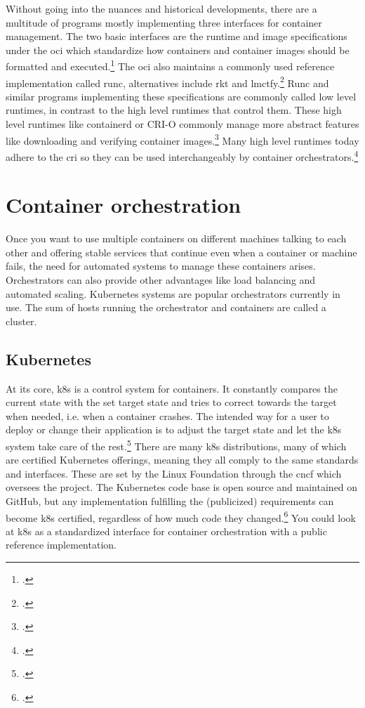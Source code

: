 Without going into the nuances and historical developments, there are a multitude of programs mostly implementing three interfaces for container management.
The two basic interfaces are the runtime and image specifications under the \gls{oci} which standardize how containers and container images should be formatted and executed.\footcite[][, first paragraph]{ociStandards}
The \gls{oci} also maintains a commonly used reference implementation called runc, alternatives include rkt and lmctfy.\footcite[][, section 'Examples of Low-Level Container Runtimes']{lowLevelRuntimes}
Runc and similar programs implementing these specifications are commonly called low level runtimes, in contrast to the high level runtimes that control them.
These high level runtimes like containerd or CRI-O commonly manage more abstract features like downloading and verifying container images.\footcite[][, Intro and section 'Examples of High-Level Runtimes']{highLevelRuntimes}
Many high level runtimes today adhere to the \gls{cri} so they can be used interchangeably by container orchestrators.\footcite[][, section 'Purpose']{criGithub}


\section{Container orchestration}
Once you want to use multiple containers on different machines talking to each other and offering stable services that continue even when a container or machine fails, the need for automated systems to manage these containers arises. Orchestrators can also provide other advantages like load balancing and automated scaling.
Kubernetes systems are popular orchestrators currently in use.
The sum of hosts running the orchestrator and containers are called a cluster.

\subsection{Kubernetes} \label{k8sTheory}
At its core, \gls{k8s} is a control system for containers.
It constantly compares the current state with the set target state and tries to correct towards the target when needed, i.e. when a container crashes.
The intended way for a user to deploy or change their application is to adjust the target state and let the \gls{k8s} system take care of the rest.\footcite[][, section 'Understanding Kubernetes Objects']{k8sObjects}
There are many \gls{k8s} distributions, many of which are certified Kubernetes offerings, meaning they all comply to the same standards and interfaces. These are set by the Linux Foundation through the \gls{cncf} which oversees the project.
The Kubernetes code base is open source and maintained on GitHub, but any implementation fulfilling the (publicized) requirements can become \gls{k8s} certified, regardless of how much code they changed.\footcite[][, section 'There are over 80 Certified Kubernetes offerings.']{certifiedK8s} You could look at \gls{k8s} as a standardized interface for container orchestration with a public reference implementation.

